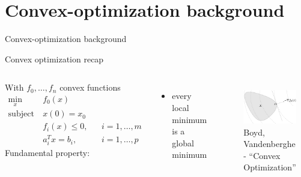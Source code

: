 \documentclass[aspectratio=169]{beamer}
\begin{document}
\section{Convex-optimization background}
\begin{frame}
\huge
\centering
{\color{darkred} Convex-optimization background}
\end{frame}

\begin{frame}{Convex optimization recap}
\begin{columns}
With $f_0, \ldots, f_n$ convex functions
\begin{align*}
\min_{x} \ &f_0(x) \\
\text{subject to} \ & x(0) = x_0 \\
& f_i(x) \leq 0, &&  i = 1, \ldots, m \\
& a_i^T x = b_i, &&  i = 1, \ldots, p
\end{align*}
Fundamental property:
\begin{itemize}
\item
{\color{darkgreen}every local minimum is a global minimum}
\end{itemize}
\begin{figure}
\includegraphics[width=\columnwidth]{figures/convex_opt.png}
\footnotesize Boyd, Vandenberghe - ``Convex Optimization''
\end{figure}
\end{columns}
\end{frame}
\end{document}
